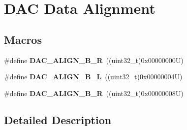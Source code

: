 \hypertarget{group___d_a_c__data__alignment}{}\section{D\+AC Data Alignment}
\label{group___d_a_c__data__alignment}
\subsection*{Macros}
\begin{DoxyCompactItemize}
\item 
\mbox{\label{group___d_a_c__data__alignment_ga10158e2a8d3568f3eb4a8cda1c951c3f}} 
\#define {\bfseries D\+A\+C\+\_\+\+A\+L\+I\+G\+N\+\_\+B\+\_\+R}~((uint32\+\_\+t)0x00000000\+U)
\item 
\mbox{\label{group___d_a_c__data__alignment_gae3bb4b491257d8386d80b2277388dfea}} 
\#define {\bfseries D\+A\+C\+\_\+\+A\+L\+I\+G\+N\+\_\+B\+\_\+L}~((uint32\+\_\+t)0x00000004\+U)
\item 
\mbox{\label{group___d_a_c__data__alignment_ga40c587f9c50207dcda458e6c0a2a9b5b}} 
\#define {\bfseries D\+A\+C\+\_\+\+A\+L\+I\+G\+N\+\_\+B\+\_\+R}~((uint32\+\_\+t)0x00000008\+U)
\end{DoxyCompactItemize}


\subsection{Detailed Description}
